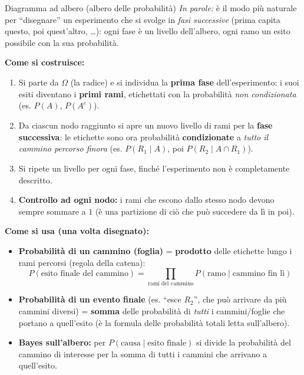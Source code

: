 \documentclass[11pt]{article}
\newcommand{\inparole}[1]{\emph{In parole:} #1}
\begin{document}
\begin{concetto}[barBlue]{Diagramma ad albero (albero delle probabilit\`a)}
\inparole{\`e il modo pi\`u naturale per ``disegnare'' un esperimento che si svolge in \emph{fasi successive} (prima capita questo, poi quest'altro, \dots): ogni fase \`e un livello dell'albero, ogni ramo un esito possibile con la sua probabilit\`a.}

\textbf{Come si costruisce:}
\begin{enumerate}[leftmargin=1.4em,itemsep=2pt,topsep=2pt]
\item Si parte da $\Omega$ (la radice) e si individua la \textbf{prima fase} dell'esperimento: i suoi esiti diventano i \textbf{primi rami}, etichettati con la probabilit\`a \emph{non condizionata} (es. $P(A)$, $P(A^c)$).
\item Da ciascun nodo raggiunto si apre un nuovo livello di rami per la \textbf{fase successiva}: le etichette sono ora probabilit\`a \textbf{condizionate} a \emph{tutto il cammino percorso finora} (es. $P(R_1\mid A)$, poi $P(R_2 \mid A\cap R_1)$).
\item Si ripete un livello per ogni fase, finch\'e l'esperimento non \`e completamente descritto.
\item \textbf{Controllo ad ogni nodo:} i rami che escono dallo stesso nodo devono sempre sommare a $1$ (\`e una partizione di ci\`o che pu\`o succedere da l\`i in poi).
\end{enumerate}

\textbf{Come si usa (una volta disegnato):}
\begin{itemize}[leftmargin=1.2em,itemsep=2pt,topsep=2pt]
\item \textbf{Probabilit\`a di un cammino (foglia)} = \textbf{prodotto} delle etichette lungo i rami percorsi (regola della catena):
\[ P(\text{esito finale del cammino}) = \prod_{\text{rami del cammino}} P(\text{ramo} \mid \text{cammino fin l\`i}) \]
\item \textbf{Probabilit\`a di un evento finale} (es. ``esce $R_2$'', che pu\`o arrivare da pi\`u cammini diversi) = \textbf{somma} delle probabilit\`a di \emph{tutti} i cammini/foglie che portano a quell'esito (\`e la formula delle probabilit\`a totali letta sull'albero).
\item \textbf{Bayes sull'albero:} per $P(\text{causa}\mid \text{esito finale})$ si divide la probabilit\`a del cammino di interesse per la somma di tutti i cammini che arrivano a quell'esito.
\end{itemize}


\end{concetto}
\end{document}
